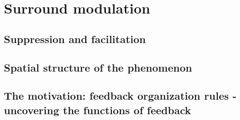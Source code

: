 \section{Surround modulation}
\label{sec:sectionb}

\subsection{Suppression and facilitation}
\label{subsec:subasectionE}


\subsection{Spatial structure of the phenomenon}
\label{subsec:subbsectionE}


\subsection{The motivation: feedback organization rules - uncovering the functions of feedback}
\label{subsec:subcsectionE}